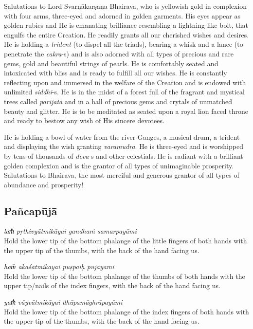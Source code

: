 \documentclass[12pt,oneside,a4paper]{article}
\newcommand{\tl}[1]{\emph{#1}}
\begin{document}
Salutations to Lord Svarṇākarṣaṇa Bhairava, who is yellowish gold in complexion
with four arms, three-eyed and adorned in golden garments. His eyes appear as
golden rubies and He is emanating brilliance resembling a lightning like bolt,
that engulfs the entire Creation. He readily grants all our cherished wishes
and desires. He is holding a \tl{trident} (to dispel all the triads), bearing
a whisk and a lance (to penetrate the \tl{cakra}-s) and is also adorned with all
types of precious and rare gems, gold and beautiful strings of pearls. He is
comfortably seated and intoxicated with bliss and is ready to fulfill all our
wishes. He is constantly reflecting upon and immersed in the welfare of the
Creation and is endowed with unlimited \tl{siddhi}-s. He is in the midst of
a forest full of the fragrant and mystical trees called \tl{pārijāta} and in
a hall of precious gems and crytals of unmatched beauty and glitter. He is to
be meditated as seated upon a royal lion faced throne and ready to bestow any
wish of His sincere devotees.

He is holding a bowl of water from the river Ganges, a musical drum, a trident
and displaying the wish granting \tl{varamudra}. He is three-eyed and is
worshipped by tens of thousands of \tl{deva}-s and other celestials. He is
radiant with a brilliant golden complexion and is the grantor of all types of
unimaginable prosperity. Salutations to Bhairava, the most merciful and generous
grantor of all types of abundance and prosperity!

\subsection{Pañcapūjā}

\tl{lam̐ pṛthivyātmikāyai gandhaṁ samarpayāmi}\\
Hold the lower tip of the bottom phalange of the little fingers of both hands
with the upper tip of the thumbs, with the back of the hand facing us.

\tl{ham̐ ākāśātmikāyai puṣpaiḥ pūjayāmi}\\
Hold the lower tip of the bottom phalange of the thumbs of both hands with
the upper tip/nails of the index fingers, with the back of the hand facing us.

\tl{yam̐ vāyvātmikāyai dhūpamāghrāpayāmi}\\
Hold the lower tip of the bottom phalange of the index fingers of both hands
with the upper tip of the thumbs, with the back of the hand facing us.
\end{document}

